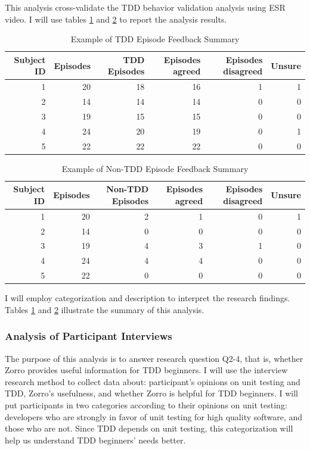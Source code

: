This analysis cross-validate the TDD behavior validation analysis using
ESR video. I will use tables \ref{tab:TDDEpisodeFeedbackSum} and
\ref{tab:NonTDDEpisodeFeedbackSum} to report the analysis results.
\begin{table}[!h]
\centering
  \begin{tabular}{|r|r||r|r|r|r|}
  \hline
    Subject ID & Episodes & TDD Episodes & Episodes agreed & Episodes disagreed & Unsure \\ \hline
    1 & 20 & 18 & 16 & 1 & 1 \\ \hline
    2 & 14 & 14 & 14 & 0 & 0 \\ \hline
    3 & 19 & 15 & 15 & 0 & 0 \\ \hline
    4 & 24 & 20 & 19 & 0 & 1 \\ \hline
    5 & 22 & 22 & 22 & 0 & 0 \\
  \hline
  \end{tabular}
  \caption{Example of TDD Episode Feedback Summary}\label{tab:TDDEpisodeFeedbackSum}  
\end{table}
\begin{table}[!h]
\centering
  \begin{tabular}{|r|r||r|r|r|r|}
  \hline
    Subject ID & Episodes & Non-TDD Episodes & Episodes agreed & Episodes disagreed & Unsure \\ \hline
    1 & 20 & 2 & 1 & 0 & 1 \\ \hline
    2 & 14 & 0 & 0 & 0 & 0 \\ \hline
    3 & 19 & 4 & 3 & 1 & 0 \\ \hline
    4 & 24 & 4 & 4 & 0 & 0 \\ \hline
    5 & 22 & 0 & 0 & 0 & 0 \\
  \hline
  \end{tabular}
  \caption{Example of Non-TDD Episode Feedback Summary}\label{tab:NonTDDEpisodeFeedbackSum}  
\end{table}
I will employ categorization and description to interpret the research
findings. Tables \ref{tab:TDDEpisodeFeedbackSum} and
\ref{tab:NonTDDEpisodeFeedbackSum} illustrate the summary of this analysis.

\subsubsection{Analysis of Participant Interviews}
The purpose of this analysis is to answer research question Q2-4, that
is, whether Zorro provides useful information for TDD beginners. I
will use the interview research method to collect data about:
participant's opinions on unit testing and TDD, Zorro's usefulness,
and whether Zorro is helpful for TDD beginners. I will put
participants in two categories according to their opinions on unit
testing: developers who are strongly in favor of unit testing for high
quality software, and those who are not. Since TDD depends on unit
testing, this categorization will help us understand TDD beginners'
needs better.

